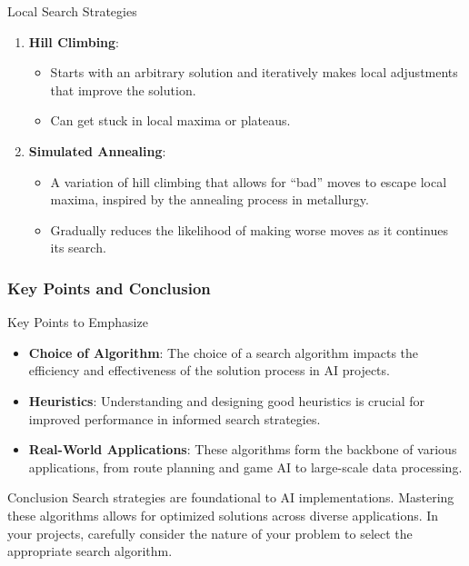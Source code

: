 \documentclass[aspectratio=169]{beamer}
\begin{document}
\begin{frame}[fragile]
\begin{block}{Local Search Strategies}
        \begin{enumerate}
            \item \textbf{Hill Climbing}:
                \begin{itemize}
                    \item Starts with an arbitrary solution and iteratively makes local adjustments that improve the solution.
                    \item Can get stuck in local maxima or plateaus.
                \end{itemize}
            \item \textbf{Simulated Annealing}:
                \begin{itemize}
                    \item A variation of hill climbing that allows for “bad” moves to escape local maxima, inspired by the annealing process in metallurgy.
                    \item Gradually reduces the likelihood of making worse moves as it continues its search.
                \end{itemize}
        \end{enumerate}
    \end{block}
\end{frame}

\begin{frame}[fragile]
    \frametitle{Key Points and Conclusion}
    
    \begin{block}{Key Points to Emphasize}
        \begin{itemize}
            \item \textbf{Choice of Algorithm}: The choice of a search algorithm impacts the efficiency and effectiveness of the solution process in AI projects.
            \item \textbf{Heuristics}: Understanding and designing good heuristics is crucial for improved performance in informed search strategies.
            \item \textbf{Real-World Applications}: These algorithms form the backbone of various applications, from route planning and game AI to large-scale data processing.
        \end{itemize}
    \end{block}

    \begin{block}{Conclusion}
        Search strategies are foundational to AI implementations. Mastering these algorithms allows for optimized solutions across diverse applications. In your projects, carefully consider the nature of your problem to select the appropriate search algorithm.
    \end{block}
\end{frame}
\end{document}
